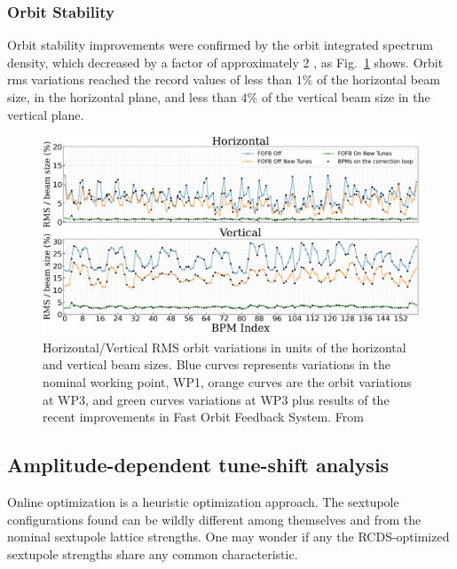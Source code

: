 \subsubsection{Orbit Stability}
Orbit stability improvements were confirmed by the orbit integrated spectrum density, which decreased by a factor of approximately 2 \cite{liu_status_2023}, as Fig.~\ref{fig:integrated_spec} shows. Orbit rms variations reached the record values of less than $1\%$ of the horizontal beam size, in the horizontal plane, and less than $4\%$ of the vertical beam size in the vertical plane.


\begin{figure}[tb]
    \centering
    \includegraphics[width=\textwidth]{Images/WEOGA2_f5.png}
    \caption[Horizontal/Vertical RMS orbit variations in units of the horizontal and vertical beam sizes.]{Horizontal/Vertical RMS orbit variations in units of the horizontal and vertical beam sizes. Blue curves represents variations in the nominal working point, WP1, orange curves are the orbit variations at WP3, and green curves variations at WP3 plus results of the recent improvements in Fast Orbit Feedback System. From~\cite{liu_status_2023}}
    \label{fig:integrated_spec}
\end{figure}

\subsection{Amplitude-dependent tune-shift analysis}
Online optimization is a heuristic optimization approach. The sextupole configurations found can be wildly different among themselves and from the nominal sextupole lattice strengths. One may wonder if any the RCDS-optimized sextupole strengths share any common characteristic.

